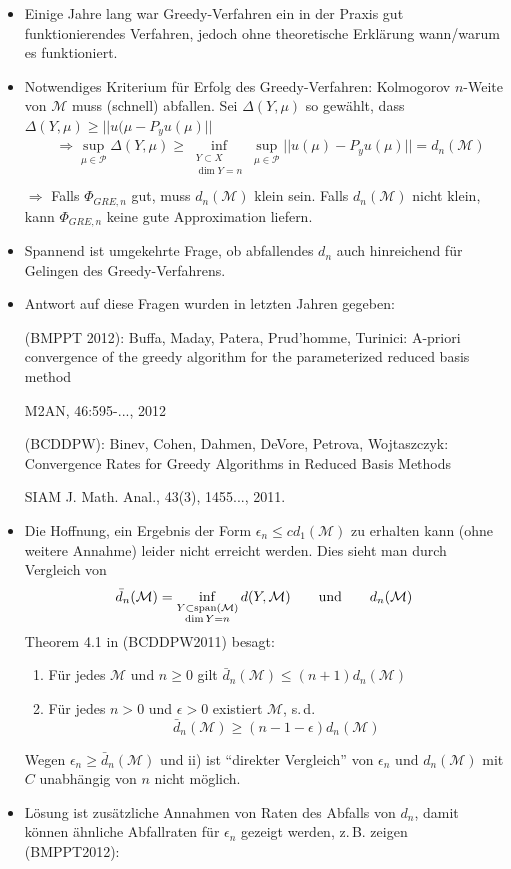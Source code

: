 \begin{bem} \beginwithlistbem
	\begin{itemize}
		\item Einige Jahre lang war Greedy-Verfahren ein in der Praxis gut funktionierendes Verfahren, jedoch ohne theoretische Erklärung wann/warum es funktioniert.
		\item Notwendiges Kriterium für Erfolg des Greedy-Verfahren: Kolmogorov $n$-Weite von $\mathcal{M}$ muss (schnell) abfallen. Sei $\Delta(Y,\mu)$ so gewählt, dass $\Delta(Y,\mu) \geq || u(\mu - P_yu(\mu)||$
		\begin{align*}
			&\Rightarrow \sup\limits_{\mu \in \mathcal{P}} \Delta(Y,\mu) \geq \inf\limits_{\substack{Y \subset X \\ \dim Y = n}} \sup\limits_{\mu \in \mathcal{P}} ||u(\mu) - P_yu(\mu)|| = d_n(\mathcal{M}) \\
		\end{align*}
		$\Rightarrow$ Falls $\Phi_{GRE,n}$ gut, muss $d_n(\mathcal{M})$ klein sein. Falls $d_n(\mathcal{M})$ nicht klein, kann $\Phi_{GRE,n}$ keine gute Approximation liefern.
		
		\item Spannend ist umgekehrte Frage, ob abfallendes $d_n$ auch hinreichend für Gelingen des Greedy-Verfahrens.
		\item Antwort auf diese Fragen wurden in letzten Jahren gegeben:
		
		(BMPPT 2012): Buffa, Maday, Patera, Prud'homme, Turinici: A-priori convergence of the greedy algorithm for the parameterized reduced basis method
		
		M2AN, 46:595-..., 2012		
		
		(BCDDPW): Binev, Cohen, Dahmen, DeVore, Petrova, Wojtaszczyk: Convergence Rates for Greedy Algorithms in Reduced Basis Methods
		
		SIAM J. Math. Anal., 43(3), 1455..., 2011.
		\item Die Hoffnung, ein Ergebnis der Form $\epsilon_n \leq c d_1(\mathcal{M})$ zu erhalten kann (ohne weitere Annahme) leider nicht erreicht werden. Dies sieht man durch Vergleich von
		\[
			\bar{d}_n(\mathcal{M}) = \inf\limits_{\substack{Y \subset \operatorname{span}(\mathcal{M}) \\ \dim Y = n}} d(Y,\mathcal{M}) \qquad \text{und} \qquad d_n(\mathcal{M})
		\]
		Theorem 4.1 in (BCDDPW2011) besagt:
		\begin{enumerate}
			\item Für jedes $\mathcal{M}$ und $n \geq 0$ gilt $\bar{d}_n(\mathcal{M}) \leq (n+1) d_n(\mathcal{M})$
			\item Für jedes $n > 0$ und $\epsilon > 0$ existiert $\mathcal{M}$, s.\,d.
			\[
				\bar{d}_n(\mathcal{M}) \geq (n-1-\epsilon)d_n(\mathcal{M})
			\]
			\end{enumerate}
		Wegen $\epsilon_n \geq \bar{d}_n(\mathcal{M})$ und ii) ist ``direkter Vergleich'' von $\epsilon_n$ und $d_n(\mathcal{M})$ mit $C$ unabhängig von $n$ nicht möglich.
		\item Lösung ist zusätzliche Annahmen von Raten des Abfalls von $d_n$, damit können ähnliche Abfallraten für $\epsilon_n$ gezeigt werden, z.\,B. zeigen (BMPPT2012):
		

\end{itemize}
\end{bem}
